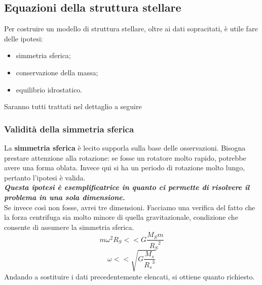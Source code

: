 \documentclass[a4paper,11pt]{article}
\begin{document}
\subsection{Equazioni della struttura stellare}
Per costruire un modello di struttura stellare, oltre ai dati sopracitati, è utile fare delle ipotesi:
\begin{itemize}
    \item simmetria sferica;
    \item conservazione della massa;
    \item equilibrio idrostatico.
\end{itemize}
Saranno tutti trattati nel dettaglio a seguire
\subsubsection{Validità della simmetria sferica}
La \textbf{simmetria sferica} è lecito supporla sulla base delle osservazioni. Bisogna prestare attenzione alla rotazione: se fosse un rotatore molto rapido, potrebbe avere una forma oblata. Invece qui si ha un periodo di rotazione molto lungo, pertanto l'ipotesi è valida.\\
\textbf{\textit{Questa ipotesi è esemplificatrice in quanto ci permette di risolvere il problema in una sola dimensione.}}\\
Se invece così non fosse, avrei tre dimensioni. Facciamo una verifica del fatto che la forza centrifuga sia molto minore di quella gravitazionale, condizione che consente di assumere la simmetria sferica.
$$m\omega^2R_S<<G\frac{M_Sm}{{R_S}^2}$$
$$\omega<<\sqrt{G\frac{M_s}{{R_s}^3}}$$
Andando a sostituire i dati precedentemente elencati, si ottiene quanto richiesto.
\end{document}

